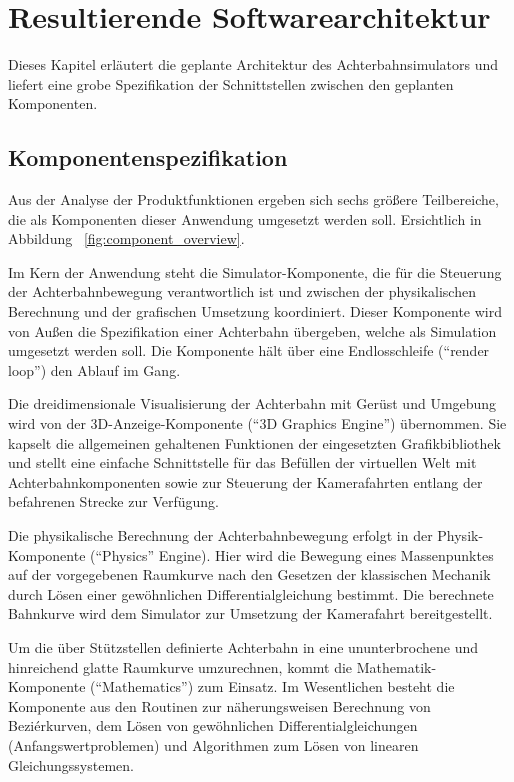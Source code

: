 \chapter{Resultierende Softwarearchitektur}

Dieses Kapitel erläutert die geplante Architektur des Achterbahnsimulators und
liefert eine grobe Spezifikation der Schnittstellen zwischen den geplanten
Komponenten.

\section{Komponentenspezifikation}

Aus der Analyse der Produktfunktionen ergeben sich sechs größere Teilbereiche,
die als Komponenten dieser Anwendung umgesetzt werden soll. Ersichtlich in Abbildung ~\ref{fig:component_overview}.

Im Kern der Anwendung steht die Simulator-Komponente, die für die Steuerung der
Achterbahnbewegung verantwortlich ist und zwischen der physikalischen Berechnung
und der grafischen Umsetzung koordiniert. Dieser Komponente wird von Außen die
Spezifikation einer Achterbahn übergeben, welche als Simulation umgesetzt werden
soll. Die Komponente hält über eine Endlosschleife (``render loop'') den Ablauf im Gang.

Die dreidimensionale Visualisierung der Achterbahn mit Gerüst und Umgebung wird
von der 3D-Anzeige-Komponente (``3D Graphics Engine'') übernommen. Sie kapselt die allgemeinen gehaltenen
Funktionen der eingesetzten Grafikbibliothek und stellt eine einfache Schnittstelle
für das Befüllen der virtuellen Welt mit Achterbahnkomponenten sowie zur Steuerung
der Kamerafahrten entlang der befahrenen Strecke zur Verfügung.

Die physikalische Berechnung der Achterbahnbewegung erfolgt in der Physik-Komponente
(``Physics'' Engine). Hier wird die Bewegung eines Massenpunktes auf der vorgegebenen Raumkurve
nach den Gesetzen der klassischen Mechanik durch Lösen einer gewöhnlichen 
Differentialgleichung bestimmt. Die berechnete Bahnkurve wird dem Simulator zur
Umsetzung der Kamerafahrt bereitgestellt.

Um die über Stützstellen definierte Achterbahn in eine ununterbrochene und hinreichend
glatte Raumkurve umzurechnen, kommt die Mathematik-Komponente (``Mathematics'') zum Einsatz. Im
Wesentlichen besteht die Komponente aus den Routinen zur näherungsweisen Berechnung
von Beziérkurven, dem Lösen von gewöhnlichen Differentialgleichungen (Anfangswertproblemen)
und Algorithmen zum Lösen von linearen Gleichungssystemen.

